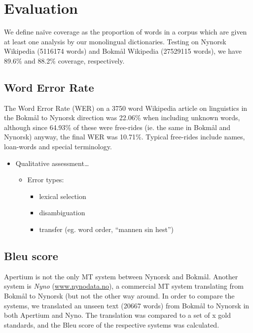 \documentclass[11pt]{article}
\begin{document}
\section{Evaluation}
\label{sec-4}

  \label{SEC:eval}
We define naïve coverage as the proportion of words in a corpus which
are given at least one analysis by our monolingual
dictionaries. Testing on Nynorsk Wikipedia (5116174 words) and Bokmål
Wikipedia (27529115 words), we have 89.6\% and 88.2\% coverage,
respectively.

\subsection{Word Error Rate}
The Word Error Rate (WER) on a 3750 word Wikipedia article on
linguistics in the Bokmål to Nynorsk direction was 22.06\% when
including unknown words, although since 64.93\% of these were
free-rides (ie. the same in Bokmål and Nynorsk) anyway, the final WER
was 10.71\%. Typical free-rides include names, loan-words and special
terminology.

\begin{itemize}
\item Qualitative assessment\ldots{}

\begin{itemize}
\item Error types:

\begin{itemize}
\item lexical selection
\item disambiguation
\item transfer (eg. word order, ``mannen sin hest'')
\end{itemize}

\end{itemize}


\end{itemize}

\subsection{Bleu score}

Apertium is not the only MT system between Nynorsk and Bokmål. Another system is \textit{Nyno} (\url{www.nynodata.no}), a commercial MT system translating from Bokmål to Nynorsk (but not the other way around. In order to compare the systems, we translated an unseen text (20667 words) from Bokmål to Nynorsk in both Apertium and Nyno. The translation was compared to a set of x gold standards, and the Bleu score of the respective systems was calculated.
\end{document}
